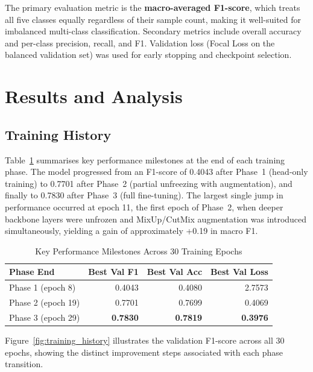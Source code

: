 \documentclass[12pt,a4paper]{article}
\begin{document}
The primary evaluation metric is the \textbf{macro-averaged F1-score}, which treats all five classes equally regardless of their sample count, making it well-suited for imbalanced multi-class classification. Secondary metrics include overall accuracy and per-class precision, recall, and F1. Validation loss (Focal Loss on the balanced validation set) was used for early stopping and checkpoint selection.

\section{Results and Analysis}

\subsection{Training History}

Table~\ref{tab:history} summarises key performance milestones at the end of each training phase. The model progressed from an F1-score of 0.4043 after Phase~1 (head-only training) to 0.7701 after Phase~2 (partial unfreezing with augmentation), and finally to 0.7830 after Phase~3 (full fine-tuning). The largest single jump in performance occurred at epoch 11, the first epoch of Phase~2, when deeper backbone layers were unfrozen and MixUp/CutMix augmentation was introduced simultaneously, yielding a gain of approximately +0.19 in macro F1.

\begin{table}[H]
\centering
\caption{Key Performance Milestones Across 30 Training Epochs}
\label{tab:history}
\begin{tabular}{|l|r|r|r|}
    \hline
    \textbf{Phase End} & \textbf{Best Val F1} & \textbf{Best Val Acc} & \textbf{Best Val Loss} \\
    \hline
    Phase 1 (epoch 8)  & 0.4043 & 0.4080 & 2.7573 \\
    \hline
    Phase 2 (epoch 19) & 0.7701 & 0.7699 & 0.4069 \\
    \hline
    Phase 3 (epoch 29) & \textbf{0.7830} & \textbf{0.7819} & \textbf{0.3976} \\
    \hline
\end{tabular}
\end{table}

Figure~\ref{fig:training_history} illustrates the validation F1-score across all 30 epochs, showing the distinct improvement steps associated with each phase transition.
\end{document}
